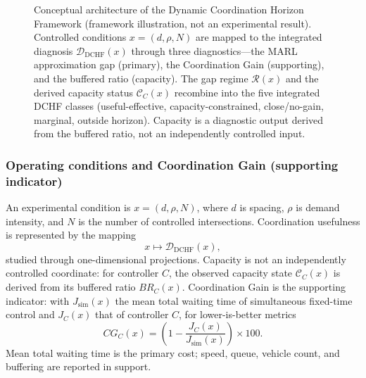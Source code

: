 \documentclass[review,12pt]{elsarticle}
\begin{document}
\begin{figure}[!htbp]
{%
}
\caption{Conceptual architecture of the Dynamic Coordination Horizon Framework (framework illustration, not an experimental result). Controlled conditions $x=(d,\rho,N)$ are mapped to the integrated diagnosis $\mathcal{D}_{\mathrm{DCHF}}(x)$ through three diagnostics---the MARL approximation gap (primary), the Coordination Gain (supporting), and the buffered ratio (capacity). The gap regime $\mathcal{R}(x)$ and the derived capacity status $\mathcal{C}_C(x)$ recombine into the five integrated DCHF classes (useful-effective, capacity-constrained, close/no-gain, marginal, outside horizon). Capacity is a diagnostic output derived from the buffered ratio, not an independently controlled input.}
\label{fig:dchf_conceptual_framework}
\end{figure}

\FloatBarrier
\subsubsection{Operating conditions and Coordination Gain (supporting indicator)}
\label{subsubsec:cg_surface}

An experimental condition is $x=(d,\rho,N)$, where $d$ is spacing, $\rho$ is demand intensity, and $N$ is the number of controlled intersections. Coordination usefulness is represented by the mapping
\[
x\longmapsto\mathcal{D}_{\mathrm{DCHF}}(x),
\]
studied through one-dimensional projections. Capacity is not an independently controlled coordinate: for controller $C$, the observed capacity state $\mathcal{C}_C(x)$ is derived from its buffered ratio $BR_C(x)$. Coordination Gain is the supporting indicator: with $J_{\mathrm{sim}}(x)$ the mean total waiting time of simultaneous fixed-time control and $J_C(x)$ that of controller $C$, for lower-is-better metrics
\begin{equation}
CG_C(x)=\left(1-\frac{J_C(x)}{J_{\mathrm{sim}}(x)}\right)\times 100 .
\label{eq:coordination_gain}
\end{equation}
Mean total waiting time is the primary cost; speed, queue, vehicle count, and buffering are reported in support.
\end{document}
